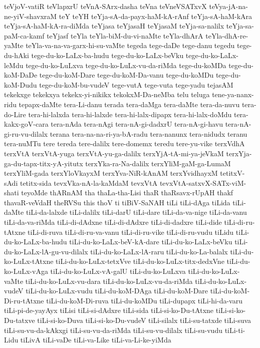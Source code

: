 {teVjoV-vatiR
teVlapxrU
teVnA-SArx-dasha
teVna
teVneVSATxvX
teVya-jA-na-ne-yiV-shavxraM
teY
teYH
teYja-sA-da-payx-haM-kA-rAnf
teYja-sA-haM-kAra
teYja-sA-haM-kA-ra-diMda
teYjasa
teYjasaH
teYjasaM
teYja-sa-nalilx
teYja-sa-paM-ca-kamf
teYjasf
teYla
teYla-biM-du-vi-naMte
teYla-dhArA
teYla-dhA-re-yaMte
teYla-va-na-va-garx-hi-su-vaMte
tegeda
tege-daDe
tege-danu
tegedu
tege-du-hAki
tege-du-ko-LaLx-ba-hudu
tege-du-ko-LaLx-beVku
tege-du-ko-LaLx-leMdu
tege-du-ko-LuLxva
tege-du-ko-LuLx-vu-da-riMda
tege-du-koMDa
tege-du-koM-DaDe
tege-du-koM-Dare
tege-du-koM-Da-vanu
tege-du-koMDu
tege-du-koM-Dudu
tege-du-koM-bu-vudeV
tege-vutA
tege-vuta
tege-yadu
tejasAM
tekekxge
tekekxya
tekekx-yi-nikikx
tekokxM-Da-neMba
telu
teluga
tene-ya-nanx-ridu
tepapx-daMte
tera-Li-danu
terada
tera-daMga
tera-daMte
tera-da-nuvu
tera-do-Lire
tera-hi-lalxda
tera-hi-lalxde
tera-hi-lalx-dipapx
tera-hi-lalx-doMdu
tera-kakx-goV-cara
tera-nAda
tera-nAgi
tera-nA-gi-dadxrU
tera-nA-gi-havu
tera-nA-gi-ru-vu-dilalx
terana
tera-na-na-ri-ya-bA-radu
tera-nanunx
tera-nidudx
teranu
tera-nuMTu
tere
tereda
tere-dalilx
tere-domemx
teredu
tere-yu-vike
terxVdhA
terxVtA
terxVtA-yuga
terxVtA-yu-ga-dalilx
terxYjA-tA-mi-ya-jeVkaM
terxYja-ga-du-tapx-titx-yA-yitutx
terxYka-ra-Na-dalilx
terxYliM-gaM-ga-LumaM
terxYliM-gada
terxYloVkayxM
terxYva-NiR-kAnAM
terxYvidhayxM
tetitxV-sAdi
tetitx-sida
tevxVka-nA-la-kaMdaM
tevxVtA
tevxVtA-satxvX-SATx-viM-shati
teyoMde
thARnAM
tha
thaLa-tha-Lisi
thaR
thaRsavx-rUpAH
thakf
thavaR-veVdaH
theRVSu
this
thoV
ti
tiBiV-SaNAH
tiLi
tiLi-dAga
tiLida
tiLi-daMte
tiLi-da-lalxde
tiLi-dalilx
tiLi-darU
tiLi-dare
tiLi-da-va-nige
tiLi-da-vanu
tiLi-da-va-riMda
tiLi-di-dAdxne
tiLi-di-dAdxre
tiLi-di-dadxre
tiLi-dide
tiLi-di-ru-tAtxne
tiLi-di-ruva
tiLi-di-ru-va-vanu
tiLi-di-ru-vike
tiLi-di-ru-vudu
tiLidu
tiLi-du-ko-LaLx-ba-hudu
tiLi-du-ko-LaLx-beV-kA-dare
tiLi-du-ko-LaLx-beVku
tiLi-du-ko-LaLx-lA-gu-vu-dilalx
tiLi-du-ko-LaLx-lA-raru
tiLi-du-ko-La-balalx
tiLi-du-ko-LuLx-tAtxne
tiLi-du-ko-LuLx-tetxVve
tiLi-du-ko-LuLx-titx-dedxVne
tiLi-du-ko-LuLx-vAga
tiLi-du-ko-LuLx-vA-galU
tiLi-du-ko-LuLxva
tiLi-du-ko-LuLx-vaMte
tiLi-du-ko-LuLx-vu-dara
tiLi-du-ko-LuLx-vu-da-riMda
tiLi-du-ko-LuLx-vudeV
tiLi-du-ko-LuLx-vudu
tiLi-du-koM-DAga
tiLi-du-koM-Dare
tiLi-du-koM-Di-ru-tAtxne
tiLi-du-koM-Di-ruva
tiLi-du-koMDu
tiLi-dupapx
tiLi-hi-da-varu
tiLi-pi-de-yayAyx
tiLisi
tiLi-si-dAdxre
tiLi-sida
tiLi-si-ko-Du-tAtxne
tiLi-si-ko-Du-tatxve
tiLi-si-ko-Duva
tiLi-si-ko-Du-vudeV
tiLi-silalx
tiLi-su-tatxde
tiLi-suva
tiLi-su-vu-da-kAkxgi
tiLi-su-vu-da-riMda
tiLi-su-vu-dilalx
tiLi-su-vudu
tiLi-ti-Lidu
tiLivA
tiLi-vaDe
tiLi-va-Like
tiLi-va-Li-ke-yiMda
}
